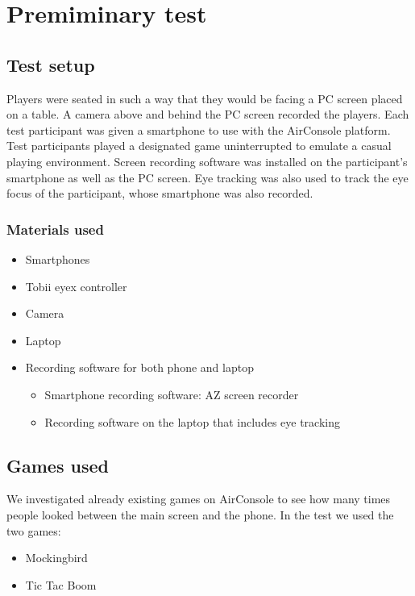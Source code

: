 \chapter{Premiminary test}\label{ch:PreTest}
\section{Test setup}
Players were seated in such a way that they would be facing a PC screen placed on a table. A camera above and behind the PC screen recorded the players. Each test participant was given a smartphone to use with the AirConsole platform. Test participants played a designated game uninterrupted to emulate a casual playing environment. Screen recording software was installed on the participant’s smartphone as well as the PC screen. Eye tracking was also used to track the eye focus of the participant, whose smartphone was also recorded.


\subsection{Materials used}
\begin{itemize}
\item Smartphones
\item Tobii eyex controller
\item Camera
\item Laptop
\item Recording software for both phone and laptop
\begin{itemize}
	\item Smartphone recording software: AZ screen recorder
	\item Recording software on the laptop that includes eye tracking
\end{itemize}
\end{itemize}

	
\section{Games used}
We investigated already existing games on AirConsole to see how many times people looked between the main screen and the phone. In the test we used the two games:
\begin{itemize}
\item Mockingbird
\item Tic Tac Boom
\end{itemize}

